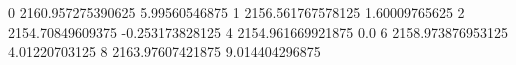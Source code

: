 0 2160.957275390625 5.99560546875
1 2156.561767578125 1.60009765625
2 2154.70849609375 -0.253173828125
4 2154.961669921875 0.0
6 2158.973876953125 4.01220703125
8 2163.97607421875 9.014404296875

